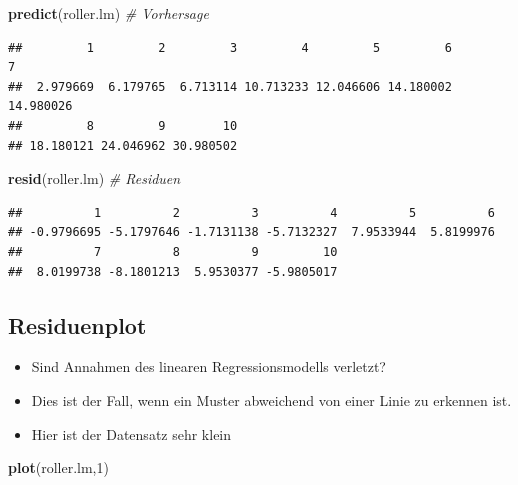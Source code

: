 \documentclass[]{article}
\newenvironment{Shaded}{\begin{snugshade}}{\end{snugshade}}
\newcommand{\KeywordTok}[1]{\textcolor[rgb]{0.13,0.29,0.53}{\textbf{{#1}}}}
\newcommand{\DecValTok}[1]{\textcolor[rgb]{0.00,0.00,0.81}{{#1}}}
\newcommand{\CommentTok}[1]{\textcolor[rgb]{0.56,0.35,0.01}{\textit{{#1}}}}
\newcommand{\NormalTok}[1]{{#1}}
\providecommand{\tightlist}{%
  \setlength{\itemsep}{0pt}\setlength{\parskip}{0pt}}
\begin{document}
\begin{Shaded}
\begin{Highlighting}[]
\KeywordTok{predict}\NormalTok{(roller.lm) }\CommentTok{# Vorhersage}
\end{Highlighting}
\end{Shaded}

\begin{verbatim}
##         1         2         3         4         5         6         7 
##  2.979669  6.179765  6.713114 10.713233 12.046606 14.180002 14.980026 
##         8         9        10 
## 18.180121 24.046962 30.980502
\end{verbatim}

\begin{Shaded}
\begin{Highlighting}[]
\KeywordTok{resid}\NormalTok{(roller.lm) }\CommentTok{# Residuen}
\end{Highlighting}
\end{Shaded}

\begin{verbatim}
##          1          2          3          4          5          6 
## -0.9796695 -5.1797646 -1.7131138 -5.7132327  7.9533944  5.8199976 
##          7          8          9         10 
##  8.0199738 -8.1801213  5.9530377 -5.9805017
\end{verbatim}

\subsection{Residuenplot}\label{residuenplot}

\begin{itemize}
\tightlist
\item
  Sind Annahmen des linearen Regressionsmodells verletzt?
\item
  Dies ist der Fall, wenn ein Muster abweichend von einer Linie zu
  erkennen ist.
\item
  Hier ist der Datensatz sehr klein
\end{itemize}

\begin{Shaded}
\begin{Highlighting}[]
\KeywordTok{plot}\NormalTok{(roller.lm,}\DecValTok{1}\NormalTok{)}
\end{Highlighting}
\end{Shaded}
\end{document}
